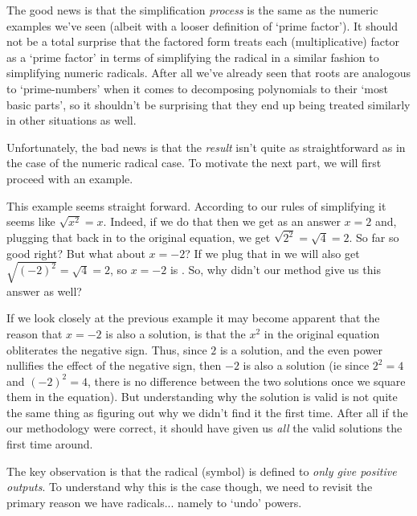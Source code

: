 \documentclass{ximeraXloud}
\begin{document}
    The good news is that the simplification \textit{process} is the same as the numeric examples we've seen (albeit with a looser definition of `prime factor'). It should not be a total surprise that the factored form treats each (multiplicative) factor as a `prime factor' in terms of simplifying the radical in a similar fashion to simplifying numeric radicals. After all we've already seen that roots are analogous to `prime-numbers' when it comes to decomposing polynomials to their `most basic parts', so it shouldn't be surprising that they end up being treated similarly in other situations as well.

    Unfortunately, the bad news is that the \textit{result} isn't quite as straightforward as in the case of the numeric radical case. To motivate the next part, we will first proceed with an example.

    \begin{example}[Find all $x$ that satisfy the equation $\sqrt{x^2} = 2$]%
        This example seems straight forward. According to our rules of simplifying it seems like $\sqrt{x^2} = x$. Indeed, if we do that then we get as an answer $x = 2$ and, plugging that back in to the original equation, we get $\sqrt{2^2} = \sqrt{4} = 2$. So far so good right? But what about $x = -2$? If we plug that in we will also get $\sqrt{(-2)^2} = \sqrt{4} = 2$, so $x = -2$ is . So, why didn't our method give us this answer as well?
    \end{example}%

    If we look closely at the previous example it may become apparent that the reason that $x = -2$ is also a solution, is that the $x^2$ in the original equation obliterates the negative sign. Thus, since $2$ is a solution, and the even power nullifies the effect of the negative sign, then $-2$ is also a solution (ie since $2^2 = 4$ and $(-2)^2 = 4$, there is no difference between the two solutions once we square them in the equation). But understanding why the solution is valid is not quite the same thing as figuring out why we didn't find it the first time. After all if the our methodology were correct, it should have given us \textit{all} the valid solutions the first time around.

    The key observation is that the radical (symbol) is defined to \textit{only give positive outputs}. To understand why this is the case though, we need to revisit the primary reason we have radicals... namely to `undo' powers.
        
%
%
%
%
%
\end{document}
